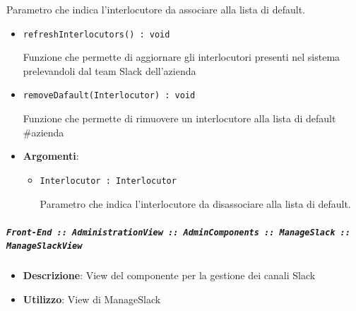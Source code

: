 \documentclass[../DefinizioneDiProdotto.tex]{subfiles}
\begin{document}
\begin{itemize}
\begin{itemize}
\begin{itemize}
\begin{itemize}
	 Parametro che indica l'interlocutore da associare alla lista di default.
	\end{itemize}
	\end{itemize}\vspace{0.5em}
	\begin{itemize}
	\item \texttt{refreshInterlocutors() : void}\

	 Funzione che permette di aggiornare gli interlocutori presenti nel sistema prelevandoli dal team Slack dell'azienda
	\end{itemize}\vspace{0.5em}
	\begin{itemize}
	\item \texttt{removeDafault(Interlocutor) : void}\

	 Funzione che permette di rimuovere un interlocutore alla lista di default \#azienda

	\item \textbf{Argomenti}:
	\begin{itemize}
	\item \texttt{Interlocutor : Interlocutor}\

	 Parametro che indica l'interlocutore da disassociare alla lista di default.
	\end{itemize}
	\end{itemize}\vspace{0.5em}
	\end{itemize}\subparagraph{\texttt{Front-End :: AdministrationView :: AdminComponents :: ManageSlack :: ManageSlackView}}
	\begin{itemize}\item \textbf{Descrizione}: View del componente per la gestione dei canali Slack
	\item \textbf{Utilizzo}: View di ManageSlack
	\end{itemize}\end{itemize}
\end{document}
